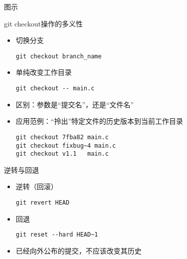 \begin{frame}{图示}
\end{frame}

\begin{frame}[<+->][fragile]{git checkout操作的多义性}
    \begin{itemize}
        \item 切换分支
        \begin{Verbatim}[frame=single,commandchars=\\\{\}]
git checkout branch_name
        \end{Verbatim}
        \item 单纯改变工作目录
        \begin{Verbatim}[frame=single,commandchars=\\\{\}]
git checkout -- main.c
        \end{Verbatim}
        \item 区别：参数是“提交名”，还是“文件名”
        \item 应用范例：“拎出”特定文件的历史版本到当前工作目录
        \begin{Verbatim}[frame=single,commandchars=\\\{\}]
git checkout 7fba82 main.c
git checkout fixbug~4 main.c
git checkout v1.1   main.c
        \end{Verbatim}
    \end{itemize}
\end{frame}


\begin{frame}[<+->][fragile]{逆转与回退}
    \begin{itemize}
        \item 逆转（回滚）
        \begin{Verbatim}[frame=single,commandchars=\\\{\}]
git revert HEAD
        \end{Verbatim}
        \item 回退
        \begin{Verbatim}[frame=single,commandchars=\\\{\}]
git reset --hard HEAD~1
        \end{Verbatim}
        \item 已经向外公布的提交，不应该改变其历史
    \end{itemize}
\end{frame}

